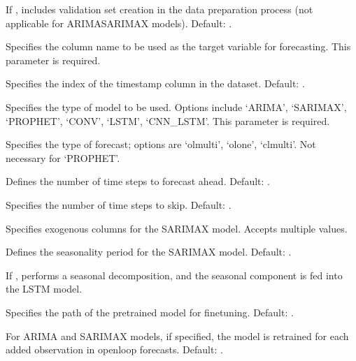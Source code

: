 \documentclass[letterpaper,10pt,english]{sphinxmanual}
\begin{document}
\begin{description}
\sphinxAtStartPar
If , includes validation set creation in the data preparation process (not applicable for ARIMA\sphinxhyphen{}SARIMAX models). Default: .

\sphinxAtStartPar
Specifies the column name to be used as the target variable for forecasting. This parameter is required.

\sphinxAtStartPar
Specifies the index of the timestamp column in the dataset. Default: .

\sphinxAtStartPar
Specifies the type of model to be used. Options include ‘ARIMA’, ‘SARIMAX’, ‘PROPHET’, ‘CONV’, ‘LSTM’, ‘CNN\_LSTM’. This parameter is required.

\sphinxAtStartPar
Specifies the type of forecast; options are ‘ol\sphinxhyphen{}multi’, ‘ol\sphinxhyphen{}one’, ‘cl\sphinxhyphen{}multi’. Not necessary for ‘PROPHET’.

\sphinxAtStartPar
Defines the number of time steps to forecast ahead. Default: .

\sphinxAtStartPar
Specifies the number of time steps to skip. Default: .

\sphinxAtStartPar
Specifies exogenous columns for the SARIMAX model. Accepts multiple values.

\sphinxAtStartPar
Defines the seasonality period for the SARIMAX model. Default: .

\sphinxAtStartPar
If , performs a seasonal decomposition, and the seasonal component is fed into the LSTM model.

\sphinxAtStartPar
Specifies the path of the pre\sphinxhyphen{}trained model for fine\sphinxhyphen{}tuning. Default: .

\sphinxAtStartPar
For ARIMA and SARIMAX models, if specified, the model is retrained for each added observation in open\sphinxhyphen{}loop forecasts. Default: .

\end{description}
\end{document}
